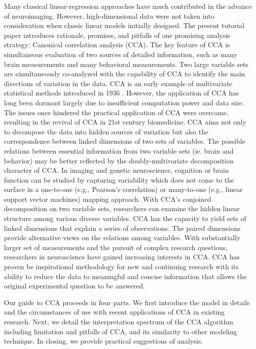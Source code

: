 Many classical linear-regression approaches have much contributed in the advance of neuroimaging. However, high-dimensional data were not taken into consideration when classic linear models initially designed. The present tutorial paper introduces rationale, promises, and pitfalls of one promising analysis strategy: Canonical correlation analysis (CCA). The key feature of CCA is simultaneous evaluation of two sources of detailed information, such as many brain measurements and many behavioral measurements. Two large variable sets are simultaneously co-analyzed with the capability of CCA to identify the main directions of variation in the data. CCA is an early example of multivariate statistical methods introduced in 1936 \cite{Hotelling1936}. However, the application of CCA has long been dormant largely due to insufficient computation power and data size. The issues once hindered the practical application of CCA were overcame, resulting in the revival of CCA in 21st century biomedicine. CCA aims not only to decompose the data into hidden sources of variation but also the correspondence between linked dimensions of two sets of variables. The possible relations between essential information from two variable sets (ie. brain and behavior) may be better reflected by the doubly-multivariate decomposition character of CCA.  In imaging and genetic neuroscience, cognition or brain function can be studied by capturing variability which does not come to the surface in a one-to-one (e.g., Pearson's correlation) or many-to-one (e.g., linear support vector machines) mapping approach. With CCA's conjoined decomposition on two variable sets, researchers can examine the hidden linear structure among various diverse variables. CCA has the capacity to yield sets of linked dimensions that explain a series of observations. The paired dimensions provide alternative views on the relations among variables. With substantially larger set of measurements and the pursuit of complex research questions, researchers in neuroscience have gained increasing interests in CCA. CCA has proven be inspirational methodology for new and continuing research \cite{Marquand2017, Smith2015,Tsvetanov2016,VatanseverNI2017,WangPsychScience2018,WangNI2018} with its ability to reduce the data to meaningful and concise information that allows the original experimental question to be answered. 

Our guide to CCA proceeds in four parts. We first introduce the model in details and the circumstances of use with recent applications of CCA in existing research. Next, we detail the interpretation spectrum of the CCA algorithm including limitation and pitfalls of CCA, and its similarity to other modeling technique. In closing, we provide practical suggestions of analysis.

